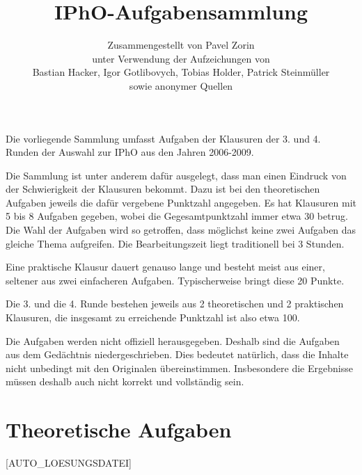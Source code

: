 \title{IPhO-Aufgabensammlung}
\author{Zusammengestellt von Pavel Zorin\\
unter Verwendung der Aufzeichungen von\\
Bastian Hacker, Igor Gotlibovych, Tobias Holder, Patrick Steinmüller\\
sowie anonymer Quellen}


\maketitle

Die vorliegende Sammlung umfasst Aufgaben der Klausuren der 3. und 4. Runden der Auswahl zur IPhO aus den Jahren 2006-2009.

Die Sammlung ist unter anderem dafür ausgelegt, dass man einen Eindruck von der Schwierigkeit der Klausuren bekommt. Dazu ist bei den theoretischen Aufgaben jeweils die dafür vergebene Punktzahl angegeben. Es hat Klausuren mit 5 bis 8 Aufgaben gegeben, wobei die Gegesamtpunktzahl immer etwa 30 betrug. Die Wahl der Aufgaben wird so getroffen, dass möglichst keine zwei Aufgaben das gleiche Thema aufgreifen. Die Bearbeitungszeit liegt traditionell bei 3 Stunden.

Eine praktische Klausur dauert genauso lange und besteht meist aus einer, seltener aus zwei einfacheren Aufgaben. Typischerweise bringt diese 20 Punkte.

Die 3. und die 4. Runde bestehen jeweils aus 2 theoretischen und 2 praktischen Klausuren, die insgesamt zu erreichende Punktzahl ist also etwa 100.

Die Aufgaben werden nicht offiziell herausgegeben. Deshalb sind die Aufgaben aus dem Gedächtnis niedergeschrieben. Dies bedeutet natürlich, dass die Inhalte nicht unbedingt mit den Originalen übereinstimmen. Insbesondere die Ergebnisse müssen deshalb auch nicht korrekt und vollständig sein.

\section*{Theoretische Aufgaben}

[AUTO_LOESUNGSDATEI]




















